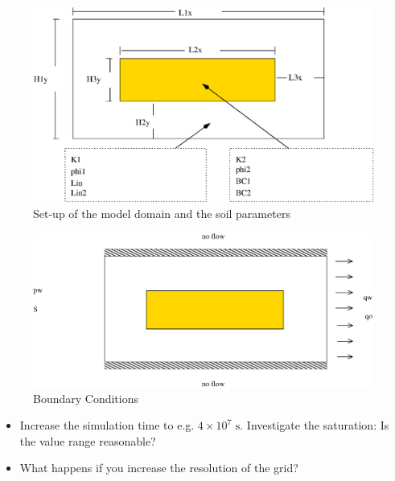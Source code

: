 \begin{figure}[h]
\centering
\includegraphics[width=0.8\linewidth,keepaspectratio]{EPS/Ex2_Domain.eps}
\caption{Set-up of the model domain and the soil parameters}\label{tutorial-coupled:ex2_Domain}
\end{figure}

\begin{figure}[h]
\centering
\includegraphics[width=0.8\linewidth,keepaspectratio]{EPS/Ex2_Boundary.eps}
\caption{Boundary Conditions}\label{tutorial-coupled:ex2_BC}
\end{figure}

\begin{itemize}
 \item Increase the simulation time to e.g. $4\times 10^7 \text{ s}$. Investigate the saturation: Is the value range reasonable?
 \item What happens if you increase the resolution of the grid?
\end{itemize}

